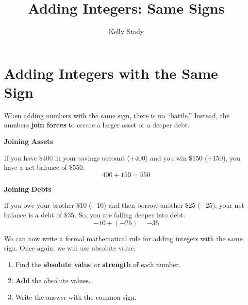 \documentclass{ximera}[font=12pt]
\title{Adding Integers: Same Signs}   %
\author{Kelly Stady}
\begin{document}
\begin{abstract}

\end{abstract}

\maketitle
\label{xim:AddIntSameSActivity}


\section*{Adding Integers with the Same Sign}

When adding numbers with the same sign, there is no ``battle.''  Instead, the numbers \textbf{join forces} to 
create a larger asset or a deeper debt.

\begin{example} \textcolor{glaucous}{\textbf{Joining Assets}}

If you have $\$400$ in your savings account ($+400$) and you win $\$150$ ($+150$), you have a net balance of \$550.
\[ 400 + 150 = 550 \]

\end{example}

\begin{example} \textcolor{glaucous}{\textbf{Joining Debts}}

If you owe your brother $\$10$ ($-10$) and then borrow another $\$25$ ($-25$), your net balance is a debt of $\$35.$  
So, you are falling deeper into debt.
\[ -10 + (-25) = -35 \]

\end{example}


We can now write a formal mathematical rule for adding integers with the same sign.  Once again, we will use absolute value.


\begin{procedure}

\begin{enumerate} 
    \item Find the \textbf{absolute value} or \textbf{strength} of each number.

     \item \textbf{Add} the absolute values.

     \item Write the answer with the common sign.
\end{enumerate}
\end{procedure}
\end{document}

